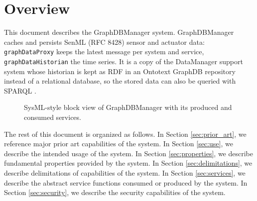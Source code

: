 \documentclass[a4paper]{arrowhead}
\begin{document}
\section{Overview}
\label{sec:overview}

This document describes the GraphDBManager system. GraphDBManager caches and persists SenML (RFC 8428) sensor and actuator data: \texttt{graphDataProxy} keeps the latest message per system and service, \texttt{graphDataHistorian} the time series. It is a copy of the DataManager support system \cite{dm-sysd-ref} whose historian is kept as RDF \cite{rdf11} in an Ontotext GraphDB repository \cite{graphdb} instead of a relational database, so the stored data can also be queried with SPARQL \cite{sparql11}.

\begin{figure}[ht!]
  \centering
  \caption{SysML-style block view of GraphDBManager with its produced and consumed services.}
  \label{fig:system}
\end{figure}

The rest of this document is organized as follows.
In Section \ref{sec:prior_art}, we reference major prior art capabilities of the system.
In Section \ref{sec:use}, we describe the intended usage of the system.
In Section \ref{sec:properties}, we describe fundamental properties provided by the system.
In Section \ref{sec:delimitations}, we describe delimitations of capabilities of the system.
In Section \ref{sec:services}, we describe the abstract service functions consumed or produced by the system.
In Section \ref{sec:security}, we describe the security capabilities of the system.
\end{document}

